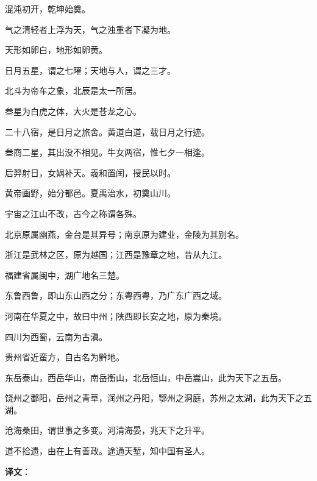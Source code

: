 \documentclass[12pt,UTF-8,openany]{ctexbook}
\begin{document}
\begin{normalsize}
    
    混沌初开，乾坤始奠。
    
    气之清轻者上浮为天，气之浊重者下凝为地。
    
    天形如卵白，地形如卵黄。
    
    日月五星，谓之七曜；天地与人，谓之三才。
    
    北斗为帝车之象，北辰是太一所居。
    
    叁星为白虎之体，大火是苍龙之心。
    
    二十八宿，是日月之旅舍。黄道白道，载日月之行迹。
    
    叁商二星，其出没不相见。牛女两宿，惟七夕一相逢。
    
    后羿射日，女娲补天。羲和置闰，授民以时。
    
    黄帝画野，始分都邑。夏禹治水，初奠山川。
    
    宇宙之江山不改，古今之称谓各殊。
    
    北京原属幽燕，金台是其异号；南京原为建业，金陵为其别名。
    
    浙江是武林之区，原为越国；江西是豫章之地，昔从九江。
    
    福建省属闽中，湖广地名三楚。
    
    东鲁西鲁，即山东山西之分；东粤西粤，乃广东广西之域。
    
    河南在华夏之中，故曰中州；陕西即长安之地，原为秦境。
    
    四川为西蜀，云南为古滇。
    
    贵州省近蛮方，自古名为黔地。
    
    东岳泰山，西岳华山，南岳衡山，北岳恒山，中岳嵩山，此为天下之五岳。
    
    饶州之鄱阳，岳州之青草，润州之丹阳，鄂州之洞庭，苏州之太湖，此为天下之五湖。
    
    沧海桑田，谓世事之多变。河清海晏，兆天下之升平。
    
    道不拾遗，由在上有善政。途通天堑，知中国有圣人。
\end{normalsize}


\newpage

\textbf{译文}：

\vspace{1em}
\end{document}

